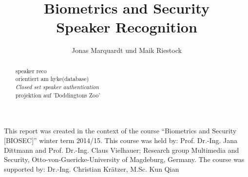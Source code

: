 \documentclass{acmtog}
\begin{document}
\title{Biometrics and Security\\ Speaker Recognition} 

\author{Jonas Marquardt {\upshape und} Maik Riestock
}




\maketitle

\begin{bottomstuff}
This report was created in the context of the course “Biometrics and Security [BIOSEC]” winter term 2014/15.
This course was held by: Prof. Dr.-Ing. Jana Dittmann and Prof. Dr.-Ing. Claus Vielhauer; Research group Multimedia and Security, Otto-von-Guericke-University of Magdeburg, Germany.
The course was supported by: Dr.-Ing. Christian Krätzer, M.Sc. Kun Qian
\end{bottomstuff}


\begin{abstract}
speaker reco\\
orientiert am hyke(database)\\
\textit{Closed set speaker authentication}\\
projektion auf 'Doddingtons Zoo'\\

\end{abstract}


\newpage

\listoftables
\appendix


\end{document}
